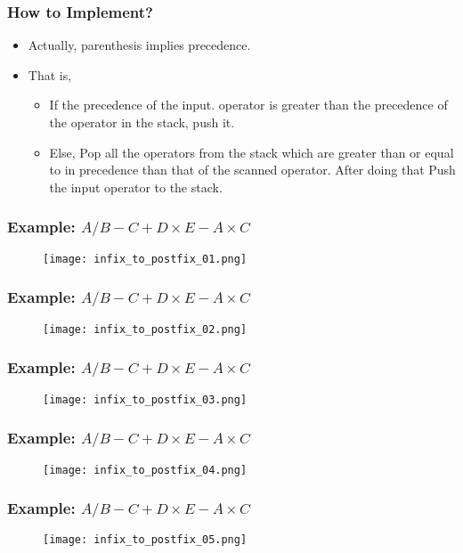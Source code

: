 \documentclass[11pt]{beamer}
\begin{document}
\begin{frame}
\frametitle{How to Implement?}
\begin{itemize}
\item Actually, parenthesis implies {\color{red}precedence}.
\item That is, 
    \begin{itemize}
    \item If the precedence of the input. operator is greater than the precedence of the operator in the stack, push it.
    \item Else, Pop all the operators from the stack which are greater than or equal to in precedence than that of the scanned operator. After doing that Push the input operator to the stack.
    \end{itemize}
\end{itemize}
\end{frame}

\begin{frame}
\frametitle{Example: $A/B-C+D\times E-A\times C$}
\begin{figure}
\centering
\texttt{[image: infix\_to\_postfix\_01.png]}
\end{figure}
\end{frame}

\begin{frame}
\frametitle{Example: $A/B-C+D\times E-A\times C$}
\begin{figure}
\centering
\texttt{[image: infix\_to\_postfix\_02.png]}
\end{figure}
\end{frame}

\begin{frame}
\frametitle{Example: $A/B-C+D\times E-A\times C$}
\begin{figure}
\centering
\texttt{[image: infix\_to\_postfix\_03.png]}
\end{figure}
\end{frame}

\begin{frame}
\frametitle{Example: $A/B-C+D\times E-A\times C$}
\begin{figure}
\centering
\texttt{[image: infix\_to\_postfix\_04.png]}
\end{figure}
\end{frame}

\begin{frame}
\frametitle{Example: $A/B-C+D\times E-A\times C$}
\begin{figure}
\centering
\texttt{[image: infix\_to\_postfix\_05.png]}
\end{figure}
\end{frame}
\end{document}
